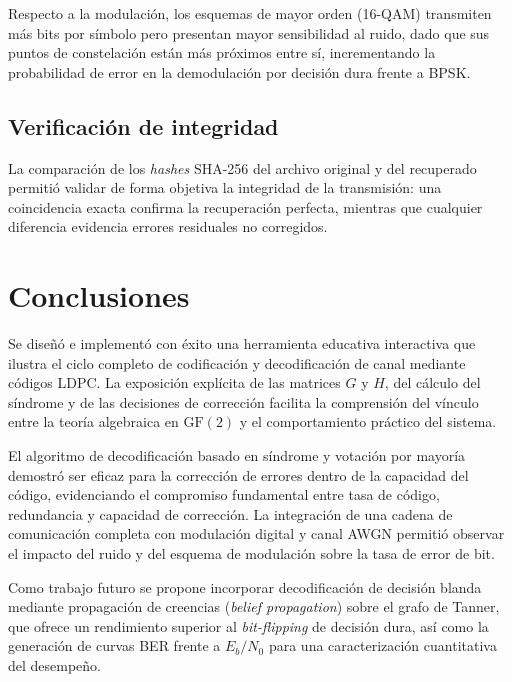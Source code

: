 \documentclass[conference]{IEEEtran}
\begin{document}
Respecto a la modulación, los esquemas de mayor orden (16-QAM) transmiten más bits por símbolo pero presentan mayor sensibilidad al ruido, dado que sus puntos de constelación están más próximos entre sí, incrementando la probabilidad de error en la demodulación por decisión dura frente a BPSK.

\subsection{Verificación de integridad}
La comparación de los \emph{hashes} SHA-256 del archivo original y del recuperado permitió validar de forma objetiva la integridad de la transmisión: una coincidencia exacta confirma la recuperación perfecta, mientras que cualquier diferencia evidencia errores residuales no corregidos.

\section{Conclusiones}
Se diseñó e implementó con éxito una herramienta educativa interactiva que ilustra el ciclo completo de codificación y decodificación de canal mediante códigos LDPC. La exposición explícita de las matrices $G$ y $H$, del cálculo del síndrome y de las decisiones de corrección facilita la comprensión del vínculo entre la teoría algebraica en $\mathrm{GF}(2)$ y el comportamiento práctico del sistema.

El algoritmo de decodificación basado en síndrome y votación por mayoría demostró ser eficaz para la corrección de errores dentro de la capacidad del código, evidenciando el compromiso fundamental entre tasa de código, redundancia y capacidad de corrección. La integración de una cadena de comunicación completa con modulación digital y canal AWGN permitió observar el impacto del ruido y del esquema de modulación sobre la tasa de error de bit.

Como trabajo futuro se propone incorporar decodificación de decisión blanda mediante propagación de creencias (\emph{belief propagation}) sobre el grafo de Tanner, que ofrece un rendimiento superior al \emph{bit-flipping} de decisión dura, así como la generación de curvas BER frente a $E_b/N_0$ para una caracterización cuantitativa del desempeño.

\end{document}
